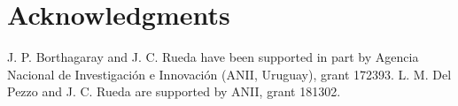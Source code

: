 \documentclass[]{amsart}
\theoremstyle{definition}
\theoremstyle{definition}
\theoremstyle{remark}
\numberwithin{equation}{section}
\begin{document}
	\section*{Acknowledgments}
    J. P. Borthagaray and J. C. Rueda  have been supported in part by Agencia Nacional de Investigación e Innovación (ANII, Uruguay), grant 172393.
%  
	L. M. Del Pezzo and J. C.  Rueda  are supported by ANII, grant 181302.%


          
	 
	
\end{document}
